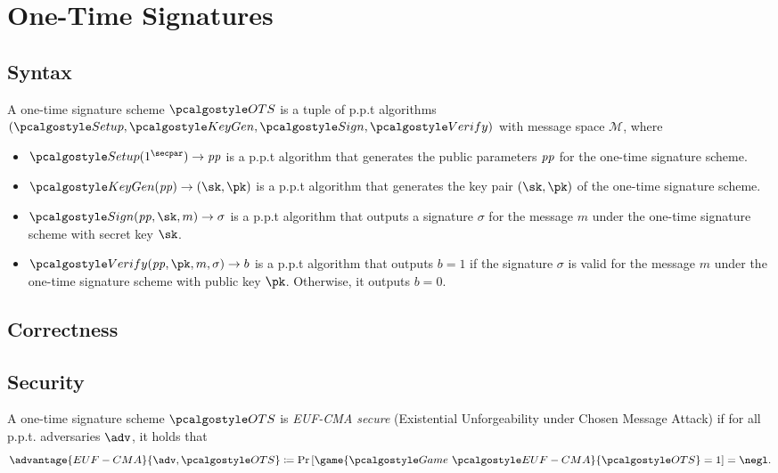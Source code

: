 \section{One-Time Signatures}\label{sec:one-time-sigs}

\subsection{Syntax}

\begin{definition}
    A one-time signature scheme $\algo{OTS}$ is a tuple of p.p.t algorithms $(\algo{Setup}, \algo{KeyGen}, \algo{Sign}, \algo{Verify})$ with message space $\mathcal{M}$, where
    \begin{itemize}
        \item $\algo{Setup}(1^\secpar)\rightarrow \params$ is a p.p.t algorithm that generates the public parameters $\mathit{pp}$ for the one-time signature scheme.
        \item $\algo{KeyGen}(\params)\rightarrow (\sk, \pk)$ is a p.p.t algorithm that generates the key pair $(\sk, \pk)$ of the one-time signature scheme.
        \item $\algo{Sign}(\params, \sk, m) \rightarrow \sigma$ is a p.p.t algorithm that outputs a signature $\sigma$ for the message $m$ under the one-time signature scheme with secret key $\sk$.
        \item $\algo{Verify}(\params, \pk, m, \sigma) \rightarrow b$ is a p.p.t algorithm that outputs $b = 1$ if the signature $\sigma$ is valid for the message $m$ under the one-time signature scheme with public key $\pk$. Otherwise, it outputs $b = 0$.
    \end{itemize}
\end{definition}


\subsection{Correctness}


\subsection{Security}

\begin{definition}\label{def:euf-cma-ot}
    A one-time signature scheme $\algo{OTS}$ is \emph{EUF-CMA secure} (Existential Unforgeability under Chosen Message Attack) if for all p.p.t. adversaries $\adv$, it holds that
    \[
    \advantage{EUF-CMA}{\adv, \algo{OTS}} \defeq \pr{\game{\Game~\algo{EUF-CMA}}{\algo{OTS}} = 1} = \negl.
    \]
\end{definition}

